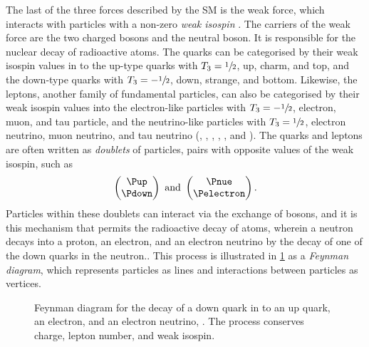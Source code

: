The last of the three forces described by the \ac{SM} is the weak force, which 
interacts with particles with a non-zero \emph{weak isospin} \wisospin.
The carriers of the weak force are the two charged \PWpm bosons and the neutral 
\PZ boson.
It is responsible for the nuclear decay of radioactive atoms.
The quarks can be categorised by their weak isospin values in to the up-type 
quarks with $T_{3} = \sfrac{1}{2}$, up, charm, and top, and the down-type 
quarks with $T_{3} = -\sfrac{1}{2}$, down, strange, and bottom.
Likewise, the leptons, another family of fundamental particles, can also be 
categorised by their weak isospin values into the electron-like particles with 
$T_{3} = -\sfrac{1}{2}$, electron, muon, and tau particle, and the 
neutrino-like particles with $T_{3} = \sfrac{1}{2}$, electron neutrino, 
muon neutrino, and tau neutrino (\Pelectron, \Pmuon, \Ptau, \Pnue, \Pnum, and 
\Pnut).
The quarks and leptons are often written as \emph{doublets} of particles, pairs 
with opposite values of the weak isospin, such as
\begin{equation}
  \begin{pmatrix}\Pup\\\Pdown\end{pmatrix}
  \text{\ and\ }
  \begin{pmatrix}\Pnue\\\Pelectron\end{pmatrix}.
  \label{intro:sm:weak_doublets}
\end{equation}
Particles within these doublets can interact via the exchange of \PWpm bosons, 
and it is this mechanism that permits the radioactive decay of atoms, wherein a 
neutron decays into a proton, an electron, and an electron neutrino by the 
decay of one of the down quarks in the neutron..
This process is illustrated in \cref{fig:intro:sm:neutron_decay} as a 
\emph{Feynman diagram}, which represents particles as lines and interactions 
between particles as vertices.

\begin{figure}
  \centering
  
  \caption{%
    Feynman diagram for the decay of a down quark in to an up quark, an 
    electron, and an electron neutrino, \decay{\Pdown}{\Pup\Pelectron\APnue}.
    The process conserves charge, lepton number, and weak isospin.
  }
  \label{fig:intro:sm:neutron_decay}
\end{figure}


